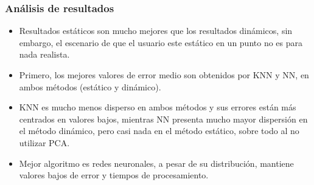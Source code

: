 \documentclass[mathserif]{beamer}
\begin{document}
\begin{frame}
\frametitle{Análisis de resultados}

\begin{itemize}

\item Resultados estáticos son mucho mejores que los resultados dinámicos, sin embargo, el escenario de que el usuario este estático en un punto no es para nada realista.
\pause

\item Primero, los mejores valores de error medio son obtenidos por KNN y NN, en ambos métodos (estático y dinámico).
\pause

\item KNN es mucho menos disperso en ambos métodos y sus errores están más centrados en valores bajos, mientras NN presenta mucho mayor dispersión en el método dinámico, pero casi nada en el método estático, sobre todo al no utilizar PCA.
\pause

\item Mejor algoritmo es redes neuronales, a pesar de su distribución, mantiene valores bajos de error y tiempos de procesamiento.

\end{itemize}



\end{frame}

\end{document}
